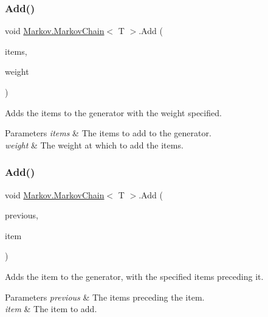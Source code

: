 \subsubsection{\texorpdfstring{Add()}{Add()}\hspace{0.1cm}{\footnotesize\ttfamily [2/6]}}
{\footnotesize\ttfamily void \mbox{\hyperlink{class_markov_1_1_markov_chain}{Markov.\+Markov\+Chain}}$<$ T $>$.Add (\begin{DoxyParamCaption}\item[{I\+Enumerable$<$ T $>$}]{items,  }\item[{int}]{weight }\end{DoxyParamCaption})}



Adds the items to the generator with the weight specified. 


\begin{DoxyParams}{Parameters}
{\em items} & The items to add to the generator.\\
\hline
{\em weight} & The weight at which to add the items.\\
\hline
\end{DoxyParams}
\mbox{\label{class_markov_1_1_markov_chain_a3de9dba327e1da281f2fb8b5b267b4bc}} 
\subsubsection{\texorpdfstring{Add()}{Add()}\hspace{0.1cm}{\footnotesize\ttfamily [3/6]}}
{\footnotesize\ttfamily void \mbox{\hyperlink{class_markov_1_1_markov_chain}{Markov.\+Markov\+Chain}}$<$ T $>$.Add (\begin{DoxyParamCaption}\item[{I\+Enumerable$<$ T $>$}]{previous,  }\item[{T}]{item }\end{DoxyParamCaption})}



Adds the item to the generator, with the specified items preceding it. 


\begin{DoxyParams}{Parameters}
{\em previous} & The items preceding the item.\\
\hline
{\em item} & The item to add.\\
\hline
\end{DoxyParams}


